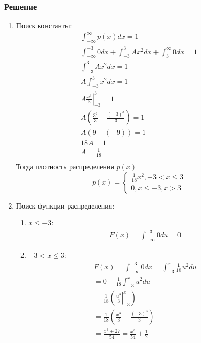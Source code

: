 \documentclass[12pt]{article}
\begin{document}
\subsubsection*{Решение}
\begin{enumerate}
	\item Поиск константы: \\
	      \begin{gather*}
		      \int_{-\infty}^{\infty}p(x)dx = 1 \\
		      \int_{-\infty}^{-3}0dx + \int_{-3}^{3}Ax^2dx + \int_{3}^{\infty}0dx = 1 \\
		      \int_{-3}^{3}Ax^2dx = 1 \\
		      A\int_{-3}^{3}x^2dx = 1 \\
		      A\left.\frac{x^3}{3}\right|^3_{-3} = 1 \\
		      A\left(\frac{3^3}{3} - \frac{(-3)^3}{3}\right) = 1 \\
		      A\left(9 - (-9)\right) = 1 \\
		      18A = 1 \\
		      A = \frac{1}{18} \\
	      \end{gather*}
	      Тогда плотность распределения $p(x)$
	      \[
		      p(x) =
		      \begin{cases}
			      \frac{1}{18}x^2, -3 < x \leq 3 \\
			      0, x \leq -3, x > 3
		      \end{cases}
	      \]
	\item Поиск функции распределения: \\
	      \begin{enumerate}
		      \item $x \leq -3$:
		            \begin{gather*}
			            F(x) = \int_{-\infty}^{-3}0du = 0
		            \end{gather*}
		      \item $-3 < x \leq 3$:
		            \begin{gather*}
			            F(x) = \int_{-\infty}^{-3}0dx = \int_{-3}^{x} \frac{1}{18}u^2du \\
			            = 0 + \frac{1}{18}\int_{-3}^{x}u^2du \\
			            = \frac{1}{18}\left(\left.\frac{u^3}{3}\right|_{-3}^{x}\right) \\
			            = \frac{1}{18}\left(\frac{x^3}{3} - \frac{(-3)^3}{3}\right) \\
			            = \frac{x^3 + 27}{54} = \frac{x^3}{54} + \frac{1}{2}

\end{gather*}
\end{enumerate}
\end{enumerate}
\end{document}
